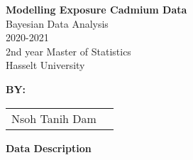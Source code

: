 \documentclass[11pt]{article}
\begin{document}
\clearpage\thispagestyle{empty}

\begin{center}
\textbf{\Large{Modelling Exposure Cadmium Data}} \\[0.5cm]
\Large{
Bayesian Data Analysis \\

2020-2021 \\[0.5cm]
2nd year Master of Statistics \\
Hasselt University
}
\end{center}

\vspace*{1cm}
\textbf{\large{BY:}}\\
\begin{table}[h]
	\begin{tabular}{ll}
		Nsoh Tanih Dam
	\end{tabular}
\end{table}


\vspace*{2.5cm}


\newpage \setcounter{page}{1}

\textbf{Data Description}
\end{document}
